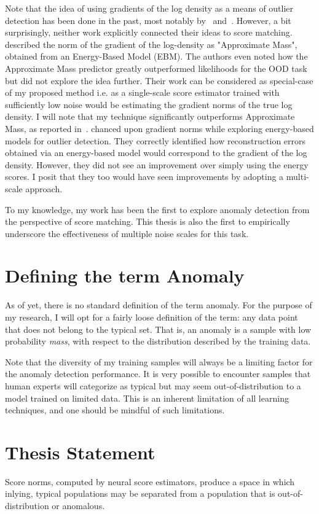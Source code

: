 Note that the idea of using gradients of the log density as a means of outlier detection has been done in the past, most notably by~\cite{Grathwohl2020Your} and~\cite{pmlr-v48-zhai16}. However, a bit surprisingly, neither work explicitly connected their ideas to score matching. \cite{Grathwohl2020Your} described the norm of the gradient of the log-density as "Approximate Mass", obtained from an Energy-Based Model (EBM). The authors even noted how the Approximate Mass predictor greatly outperformed likelihoods for the OOD task but did not explore the idea further. Their work can be considered as special-case of my proposed method i.e. as a single-scale score estimator trained with sufficiently low noise would be estimating the gradient norms of the true log density. I will note that my technique significantly outperforms Approximate Mass, as reported in~\cite{mahmood2021multiscale}. \cite{pmlr-v48-zhai16} chanced upon gradient norms while exploring energy-based models for outlier detection. They correctly identified how reconstruction errors obtained via an energy-based model would correspond to the gradient of the log density. However, they did not see an improvement over simply using the energy scores. I posit that they too would have seen improvements by adopting a multi-scale approach. 

To my knowledge, my work has been the first to explore anomaly detection from the perspective of score matching. This thesis is also the first to empirically underscore the effectiveness of multiple noise scales for this task.


\section{Defining the term Anomaly}
As of yet, there is no standard definition of the term anomaly. 
For the purpose of my research, I will opt for a fairly loose definition of the term: any data point that does not belong to the typical set. That is, an anomaly is a sample with low probability \textit{mass}, with respect to the distribution described by the training data. 

Note that the diversity of my training samples will always be a limiting factor for the anomaly detection performance. It is very possible to encounter samples that human experts will categorize as typical but may seem out-of-distribution to a model trained on limited data. This is an inherent limitation of all learning techniques, and one should be mindful of such limitations.

\section{Thesis Statement}

Score norms, computed by neural score estimators, produce a space in which inlying, typical populations may be separated from a population that is out-of-distribution or anomalous.